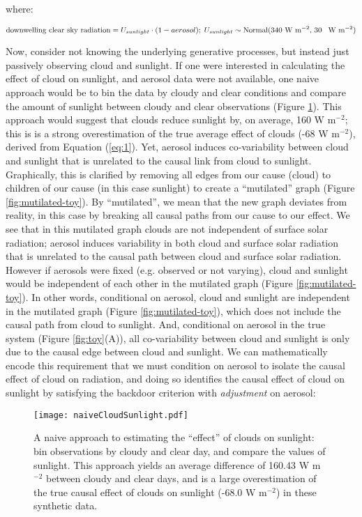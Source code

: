 \documentclass[12pt]{article}
\begin{document}
where:

\begin{equation*} \text{downwelling clear sky radiation} =
  U_{sunlight} \cdot (1 - aerosol); \; U_{sunlight} \sim
  \text{Normal(340 W m$^{-2}$, 30 \, W m$^{-2}$)}
\end{equation*}

Now, consider not knowing the underlying generative processes, but
instead just passively observing cloud and sunlight. If one were
interested in calculating the effect of cloud on sunlight, and aerosol
data were not available, one naive approach would be to bin the data
by cloudy and clear conditions and compare the amount of sunlight
between cloudy and clear observations (Figure
\ref{fig:naive-cloud-sunlight}). This approach would suggest that
clouds reduce sunlight by, on average, 160 W m$^{-2}$; this is is a
strong overestimation of the true average effect of clouds (-68 W
m$^{-2}$), derived from Equation (\ref{eq:1}). Yet, aerosol induces
co-variability between cloud and sunlight that is unrelated to the
causal link from cloud to sunlight. Graphically, this is clarified by
removing all edges from our cause (cloud) to children of our cause (in
this case sunlight) to create a ``mutilated'' graph (Figure
\ref{fig:mutilated-toy}). By ``mutilated'', we mean that the new graph
deviates from reality, in this case by breaking all causal paths from
our cause to our effect. We see that in this mutilated graph clouds
are not independent of surface solar radiation; aerosol induces
variability in both cloud and surface solar radiation that is
unrelated to the causal path between cloud and surface solar
radiation.  However if aerosols were fixed (e.g. observed or not
varying), cloud and sunlight would be independent of each other in the
mutilated graph (Figure \ref{fig:mutilated-toy}). In other words,
conditional on aerosol, cloud and sunlight are independent in the
mutilated graph (Figure \ref{fig:mutilated-toy}), which does not
include the causal path from cloud to sunlight. And, conditional on
aerosol in the true system (Figure \ref{fig:toy}(A)), all
co-variability between cloud and sunlight is only due to the causal
edge between cloud and sunlight.  We can mathematically encode this
requirement that we must condition on aerosol to isolate the causal
effect of cloud on radiation, and doing so identifies the causal
effect of cloud on sunlight by satisfying the backdoor criterion with
\textit{adjustment} on aerosol:

\begin{figure} \texttt{[image: naiveCloudSunlight.pdf]}
  \caption{A naive approach to estimating the ``effect'' of clouds on
    sunlight: bin observations by cloudy and clear day, and compare the
    values of sunlight. This approach yields an average difference of
    160.43 W m$^{-2}$ between cloudy and clear days, and is a large
    overestimation of the true causal effect of clouds on sunlight (-68.0
    W m$^{-2}$) in these synthetic data.}
  \label{fig:naive-cloud-sunlight}
\end{figure}
\end{document}
